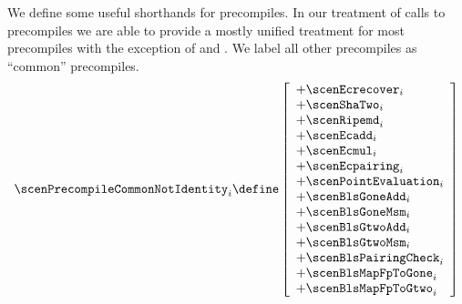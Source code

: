 We define some useful shorthands for precompiles.
In our treatment of calls to precompiles we are able to provide a mostly unified treatment for most precompiles with the exception of  and .
We label all other precompiles as ``common'' precompiles.
\[
	\scenPrecompileCommonNotIdentity _{i}
	\define
	\left[ \begin{array}{l}
		+ \scenEcrecover       _{i} \\
		+ \scenShaTwo          _{i} \\
		+ \scenRipemd          _{i} \\
		+ \scenEcadd           _{i} \\
		+ \scenEcmul           _{i} \\
		+ \scenEcpairing       _{i} \\
		+ \scenPointEvaluation _{i} \\
		+ \scenBlsGoneAdd      _{i} \\
		+ \scenBlsGoneMsm      _{i} \\
		+ \scenBlsGtwoAdd      _{i} \\
		+ \scenBlsGtwoMsm      _{i} \\
		+ \scenBlsPairingCheck _{i} \\
		+ \scenBlsMapFpToGone  _{i} \\
		+ \scenBlsMapFpToGtwo  _{i} \\
	\end{array} \right]
\]
